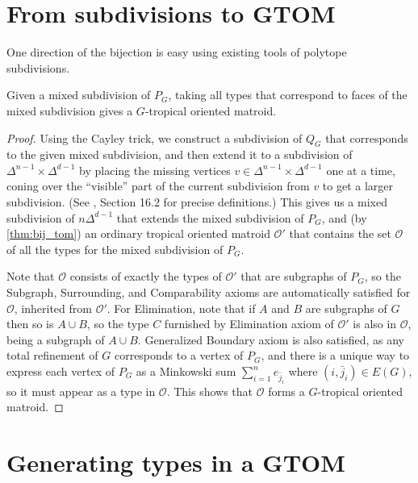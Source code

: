 \documentclass[letterpaper,reqno,11pt]{amsart}
\begin{document}
\section{From subdivisions to GTOM}\label{sec:subdiv_to_gtom}

One direction of the bijection is easy using existing tools of polytope subdivisions.

\begin{proposition}\label{prop:sub_to_gtom}
    Given a mixed subdivision of $P_G$, taking all types that correspond to faces of the mixed subdivision gives a $G$-tropical oriented matroid.
\end{proposition}

\begin{proof}
    Using the Cayley trick, we construct a subdivision of $Q_G$ that corresponds to the given mixed subdivision, and then extend it to a subdivision of $\Delta^{n-1}\times \Delta^{d-1}$ by placing the missing vertices $v\in \Delta^{n-1}\times \Delta^{d-1}$ one at a time, coning over the ``visible'' part of the current subdivision from $v$ to get a larger subdivision. (See \cite{toth2017handbook}, Section 16.2 for precise definitions.) This gives us a mixed subdivision of $n\Delta^{d-1}$ that extends the mixed subdivision of $P_G$, and (by \cref{thm:bij_tom}) an ordinary tropical oriented matroid $\mathcal{O}'$ that contains the set $\mathcal{O}$ of all the types for the mixed subdivision of $P_G$.

    Note that $\mathcal{O}$ consists of exactly the types of $\mathcal{O}'$ that are subgraphs of $P_G$, so the Subgraph, Surrounding, and Comparability axioms are automatically satisfied for $\mathcal{O}$, inherited from $\mathcal{O}'$. For Elimination, note that if $A$ and $B$ are subgraphs of $G$ then so is $A\cup B$, so the type $C$ furnished by Elimination axiom of $\mathcal{O}'$ is also in $\mathcal{O}$, being a subgraph of $A\cup B$. Generalized Boundary axiom is also satisfied, as any total refinement of $G$ corresponds to a vertex of $P_G$, and there is a unique way to express each vertex of $P_G$ as a Minkowski sum $\sum_{i=1}^n e_{\bar{j}_i}$ where $(i, \bar{j}_i)\in E(G)$, so it must appear as a type in $\mathcal{O}$. This shows that $\mathcal{O}$ forms a $G$-tropical oriented matroid.
\end{proof}

\section{Generating types in a GTOM}\label{sec:type_in_gtom}
\end{document}
